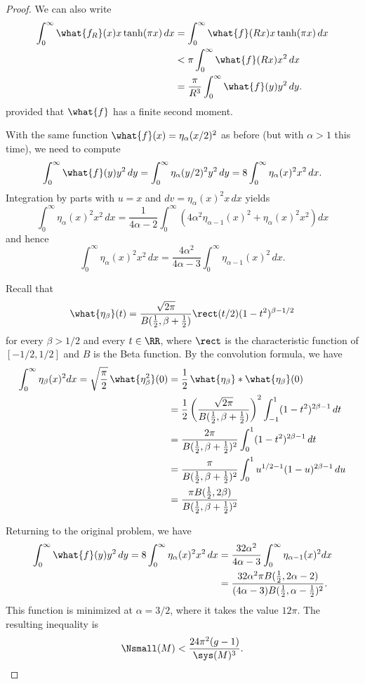 \documentclass[12pt]{amsart}
\numberwithin{equation}{section}
\begin{document}
\begin{proof}
We can also write
\begin{align*}
\int_0^\infty \what{f_R}(x) x \tanh(\pi x )\, dx &= \int_0^\infty \what{f}(Rx) x \tanh(\pi x )\, dx \\
&< \pi \int_0^\infty \what{f}(Rx) x^2\, dx \\
& = \frac{\pi}{R^3} \int_0^\infty \what{f}(y) y^2 \, dy.
\end{align*}
provided that $\what{f}$ has a finite second moment.

With the same function $\what{f}(x) = \eta_\alpha(x/2)^2$ as before (but with $\alpha>1$ this time),  we need to compute
\[
\int_0^\infty \what{f}(y) y^2 \, dy =  \int_0^\infty \eta_\alpha(y/2)^2 y^2 \, dy = 8 \int_0^\infty \eta_\alpha(x)^2 x^2 \, dx.
\]
Integration by parts with $u = x$ and $dv = \eta_\alpha(x)^2 x \,dx$ yields
\[
\int_0^\infty \eta_\alpha(x)^2 x^2 \, dx = \frac{1}{4\alpha-2} \int_0^\infty \left(4 \alpha^2 \eta_{\alpha-1}(x)^2 + \eta_\alpha(x)^2x^2\right) dx
\]
and hence
\[
\int_0^\infty \eta_\alpha(x)^2 x^2 \, dx = \frac{4\alpha^2}{4\alpha-3} \int_0^\infty \eta_{\alpha-1}(x)^2 \,dx.
\]

Recall that
\[
\what{\eta_\beta}(t)=\frac{\sqrt{2\pi}}{B(\frac12,\beta+\frac12)} \rect(t/2) (1-t^2)^{\beta - 1/2}
\]
for every $\beta > 1/2$ and every $t \in \RR$, where $\rect$ is the characteristic function of $[-1/2,1/2]$ and $B$ is the Beta function. By the convolution formula, we have
\begin{align*}
\int_0^\infty \eta_\beta(x)^2 dx =  \sqrt{\frac{\pi}{2}} \, \what{\eta_\beta^2}(0) &= \frac12 \, \what{\eta_\beta}\ast \what{\eta_\beta}(0) \\
&= \frac12 \left(\frac{\sqrt{2\pi}}{B(\frac12,\beta+\frac12)}\right)^2 \int_{-1}^1 (1-t^2)^{2\beta-1} \,dt \\
&= \frac{2\pi}{B(\frac12,\beta+\frac12)^2} \int_0^1 (1-t^2)^{2\beta-1} \,dt \\
& =\frac{\pi}{B(\frac12,\beta+\frac12)^2} \int_0^1 u^{1/2 - 1}(1-u)^{2\beta-1} \,du \\
& = \frac{\pi B(\textstyle\frac12,2\beta)}{B(\frac12,\beta+\frac12)^2}
\end{align*}

Returning to the original problem, we have
\begin{align*}
\int_0^\infty \what{f}(y) y^2 \, dy  = 8 \int_0^\infty \eta_\alpha(x)^2 x^2 \, dx &= \frac{32\alpha^2}{4\alpha-3} \int_0^\infty \eta_{\alpha-1}(x)^2 dx \\
&= \frac{32\alpha^2 \pi B(\textstyle\frac12,2\alpha-2)}{(4\alpha-3)B(\frac12,\alpha-\frac12)^2}.
\end{align*}
This function is minimized at $\alpha = 3/2$, where it takes the value $12\pi$. The resulting inequality is
\[
\Nsmall(M) < \frac{24\pi^2(g-1)}{\sys(M)^3}.  \qedhere
\]
\end{proof}
\end{document}
